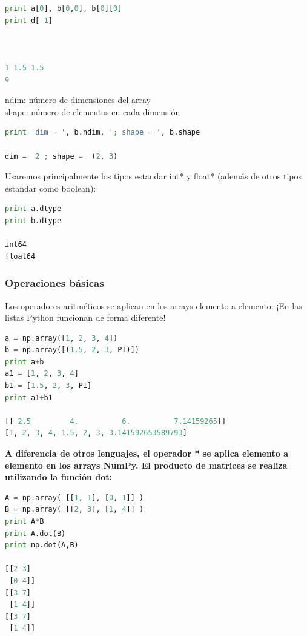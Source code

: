 \documentclass[a4paper, openright, 12pt]{article}
\begin{document}
\begin{lstlisting}[language=Python]
print a[0], b[0,0], b[0][0]
print d[-1]



1 1.5 1.5
9
\end{lstlisting}


ndim: número de dimensiones del array\\

shape: número de elementos en cada dimensión\\

\begin{lstlisting}[language=Python]
print 'dim = ', b.ndim, '; shape = ', b.shape

dim =  2 ; shape =  (2, 3)
\end{lstlisting}

Usaremos principalmente los tipos estandar int* y float* (además de otros tipos estandar como boolean):\\

\begin{lstlisting}[language=Python]
print a.dtype
print b.dtype

int64
float64

\end{lstlisting}


  \subsubsection{Operaciones básicas}

Los operadores aritméticos se aplican en los arrays elemento a elemento. ¡En las listas Python funcionan de forma diferente!\\

\begin{lstlisting}[language=Python]
a = np.array([1, 2, 3, 4])
b = np.array([(1.5, 2, 3, PI)])
print a+b
a1 = [1, 2, 3, 4]
b1 = [1.5, 2, 3, PI]
print a1+b1

[[ 2.5         4.          6.          7.14159265]]
[1, 2, 3, 4, 1.5, 2, 3, 3.141592653589793]
\end{lstlisting}


\textbf{A diferencia de otros lenguajes, el operador * se aplica elemento a elemento en los arrays NumPy. El producto de matrices se realiza utilizando la función dot:}

\begin{lstlisting}[language=Python]
A = np.array( [[1, 1], [0, 1]] )
B = np.array( [[2, 3], [1, 4]] )
print A*B
print A.dot(B)
print np.dot(A,B)

[[2 3]
 [0 4]]
[[3 7]
 [1 4]]
[[3 7]
 [1 4]]
\end{lstlisting}
\end{document}
